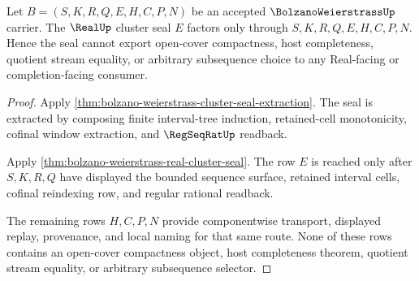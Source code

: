 \begin{theorem}
\label{thm:bolzano-weierstrass-cluster-seal-real-nonescape}
Let $B=(S,K,R,Q,E,H,C,P,N)$ be an accepted $\BolzanoWeierstrassUp$ carrier. The $\RealUp$ cluster seal $E$ factors only through $S,K,R,Q,E,H,C,P,N$. Hence the seal cannot export open-cover compactness, host completeness, quotient stream equality, or arbitrary subsequence choice to any Real-facing or completion-facing consumer.
\end{theorem}
\begin{proof}
Apply \autoref{thm:bolzano-weierstrass-cluster-seal-extraction}. The seal is extracted by composing finite interval-tree induction, retained-cell monotonicity, cofinal window extraction, and $\RegSeqRatUp$ readback.

Apply \autoref{thm:bolzano-weierstrass-real-cluster-seal}. The row $E$ is reached only after $S,K,R,Q$ have displayed the bounded sequence surface, retained interval cells, cofinal reindexing row, and regular rational readback.

The remaining rows $H,C,P,N$ provide componentwise transport, displayed replay, provenance, and local naming for that same route. None of these rows contains an open-cover compactness object, host completeness theorem, quotient stream equality, or arbitrary subsequence selector.
\end{proof}

